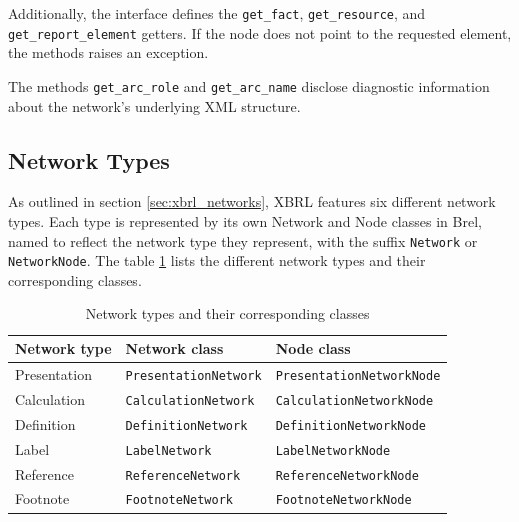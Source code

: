 Additionally, the interface defines the \texttt{get\_fact}, \texttt{get\_resource}, and \texttt{get\_report\_element} getters.
If the node does not point to the requested element, the methods raises an exception.

The methods \texttt{get\_arc\_role} and \texttt{get\_arc\_name} disclose diagnostic information about the network's underlying XML structure.

\subsection{Network Types}

As outlined in section \ref{sec:xbrl_networks}, XBRL features six different network types.
Each type is represented by its own Network and Node classes in Brel,
named to reflect the network type they represent, with the suffix \texttt{Network} or \texttt{NetworkNode}.
The table \ref{tab:network_types} lists the different network types and their corresponding classes.

\begin{table}[H]
    \centering
    \caption{Network types and their corresponding classes}
    \begin{tabular}{|l|l|l|}
        \hline
        \textbf{Network type} & \textbf{Network class} & \textbf{Node class} \\ \hline
        Presentation          & \texttt{PresentationNetwork}          & \texttt{PresentationNetworkNode}          \\ \hline
        Calculation           & \texttt{CalculationNetwork}           & \texttt{CalculationNetworkNode}           \\ \hline
        Definition            & \texttt{DefinitionNetwork}            & \texttt{DefinitionNetworkNode}            \\ \hline
        Label                 & \texttt{LabelNetwork}                 & \texttt{LabelNetworkNode}                 \\ \hline
        Reference             & \texttt{ReferenceNetwork}             & \texttt{ReferenceNetworkNode}             \\ \hline
        Footnote              & \texttt{FootnoteNetwork}              & \texttt{FootnoteNetworkNode}              \\ \hline
    \end{tabular}
    \label{tab:network_types}
\end{table}

